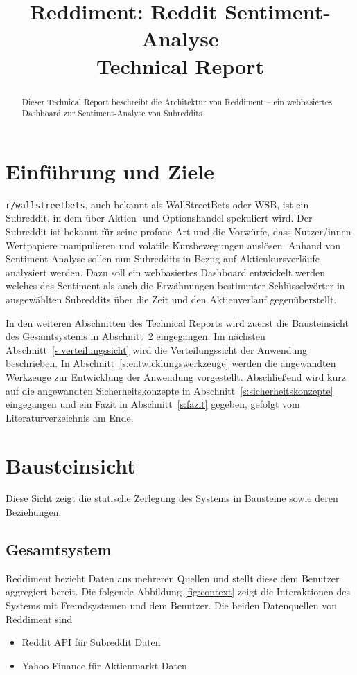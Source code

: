 \documentclass[a4paper, 10pt, conference]{IEEEtran}
\title{\LARGE
\textbf{Reddiment: Reddit Sentiment-Analyse} \\ Technical Report
}
\author{
\IEEEauthorblockN{Tobias Bauer} \IEEEauthorblockA{\textit{t.bauer@oth-aw.de}}\and
\IEEEauthorblockN{Fabian Beer} \IEEEauthorblockA{\textit{f.beer1@oth-aw.de}}\and
\IEEEauthorblockN{Daniel Holl} \IEEEauthorblockA{\textit{d.holl1@oth-aw.de}}\and\and[\\]\and
\IEEEauthorblockN{Ardian Imeraj} \IEEEauthorblockA{\textit{a.imeraj@oth-aw.de}}\and
\IEEEauthorblockN{Konrad Schweiger} \IEEEauthorblockA{\textit{k.schweiger@oth-aw.de}}\and
\IEEEauthorblockN{Philipp Stangl} \IEEEauthorblockA{\textit{p.stangl1@oth-aw.de}}\and
\IEEEauthorblockN{Wolfgang Weigl} \IEEEauthorblockA{\textit{w.weigl@oth-aw.de}}\and
}
\begin{document}
\maketitle
\thispagestyle{empty}
\pagestyle{empty}

\begin{abstract}
Dieser Technical Report beschreibt die Architektur von Reddiment -- ein webbasiertes Dashboard zur Sentiment-Analyse von Subreddits. 
\end{abstract}

\section{Einführung und Ziele}

\texttt{r/wallstreetbets}, auch bekannt als WallStreetBets oder WSB, ist ein Subreddit, in dem über Aktien- und Optionshandel spekuliert wird.  Der Subreddit ist bekannt für seine profane Art und die Vorwürfe, dass Nutzer/innen Wertpapiere manipulieren und volatile Kursbewegungen auslösen. Anhand von Sentiment-Analyse sollen nun Subreddits in Bezug auf Aktienkursverläufe analysiert werden. Dazu soll ein webbasiertes Dashboard entwickelt werden welches das Sentiment als auch die Erwähnungen bestimmter Schlüsselwörter in ausgewählten Subreddits über die Zeit und den Aktienverlauf gegenüberstellt. 

In den weiteren Abschnitten des Technical Reports wird zuerst die Bausteinsicht des Gesamtsystems in Abschnitt~\ref{s:bausteinsicht} eingegangen. Im nächsten Abschnitt~\ref{s:verteilungssicht} wird die Verteilungssicht der Anwendung beschrieben. In Abschnitt~\ref{s:entwicklungswerkzeuge} werden die angewandten Werkzeuge zur Entwicklung der Anwendung vorgestellt. Abschließend wird kurz auf die angewandten Sicherheitskonzepte in Abschnitt~\ref{s:sicherheitskonzepte} eingegangen und ein Fazit in Abschnitt~\ref{s:fazit} gegeben, gefolgt vom Literaturverzeichnis am Ende.

\section{Bausteinsicht} \label{s:bausteinsicht}
Diese Sicht zeigt die statische Zerlegung des Systems in Bausteine sowie deren Beziehungen. 

\subsection{Gesamtsystem}
Reddiment bezieht Daten aus mehreren Quellen und stellt diese dem Benutzer aggregiert bereit. Die folgende Abbildung \ref{fig:context} zeigt die Interaktionen des Systems mit Fremdsystemen und dem Benutzer. Die beiden Datenquellen von Reddiment sind 
\begin{itemize}
  \item Reddit API für Subreddit Daten 
  \item Yahoo Finance für Aktienmarkt Daten
\end{itemize}
\end{document}
